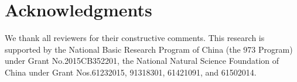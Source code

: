 \documentclass[11pt]{article}
\begin{document}
\section*{Acknowledgments}
We thank all reviewers for their constructive comments.
This research is supported by the National Basic Research Program of China (the 973 Program) under Grant No.\@ 2015CB352201, the National Natural Science Foundation of China under Grant Nos.\@ 61232015, 91318301, 61421091, and 61502014. 



\end{document}
